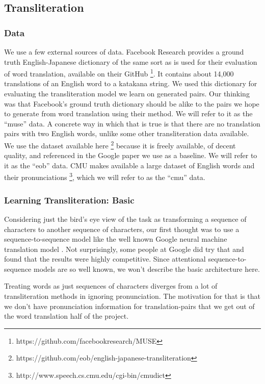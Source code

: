 \documentclass{article}
\begin{document}
\subsection*{Transliteration}

\subsubsection*{Data}

We use a few external sources of data.
Facebook Research provides a ground truth English-Japanese dictionary
of the same sort as is used for their evaluation of word translation,
available on their GitHub
\footnote{https://github.com/facebookresearch/MUSE}.
It contains about 14,000 translations of an English word to a katakana string.
We used this dictionary for evaluating the transliteration model
we learn on generated pairs.
Our thinking was that Facebook's ground truth dictionary
should be alike to the pairs we hope to generate from word translation
using their method.
We will refer to it as the ``muse'' data.
A concrete way in which that is true is that
there are no translation pairs with two English words,
unlike some other transliteration data available.
We use the dataset available here
\footnote{https://github.com/eob/english-japanese-transliteration}
because it is freely available,
of decent quality,
and referenced in the Google paper\cite{Rosca2016SequencetosequenceNN}
we use as a baseline.
We will refer to it as the ``eob'' data.
CMU makes available a large dataset of English words and their pronunciations
\footnote{http://www.speech.cs.cmu.edu/cgi-bin/cmudict},
which we will refer to as the ``cmu'' data.

\subsubsection*{Learning Transliteration: Basic}

Considering just the bird's eye view of the task
as transforming a sequence of characters to another sequence of characters,
our first thought was to use a sequence-to-sequence model
like the well known Google neural machine translation model
\cite{Wu2016GooglesNM}.
Not surprisingly,
some people at Google did try that \cite{Rosca2016SequencetosequenceNN}
and found that the results were highly competitive.
Since attentional sequence-to-sequence models \cite{Bahdanau2015NeuralMT}
are so well known,
we won't describe the basic architecture here.

Treating words as just sequences of characters
diverges from a lot of transliteration methods
in ignoring pronunciation.
The motivation for that
is that we don't have pronunciation information for translation-pairs
that we get out of the word translation half of the project.
\end{document}
